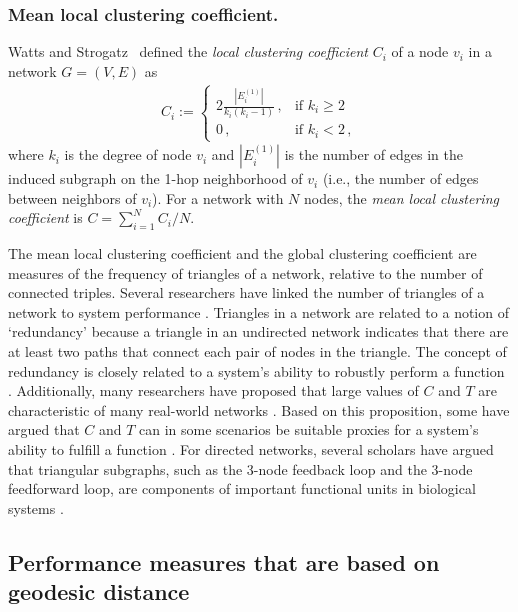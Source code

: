 \documentclass{comnet-mod}
\begin{document}
\subsubsection{Mean local clustering coefficient.}

Watts and Strogatz~\cite{Watts1998} defined the \textit{local clustering coefficient} $C_i$ of a node $v_i$ in a network $G=(V,E)$ as 
\begin{align}
	C_i := \left\{\begin{matrix}2\frac{|E^{(1)}_{i}|}{k_i(k_i-1)}\,, & \textrm{if } k_i \geq 2 \\
		0\,, & \textrm{if } k_i < 2\,,\end{matrix}\right.\label{eq:lcc}
\end{align}
where $k_i$ is the degree of node $v_i$ and $|E^{(1)}_{i}|$ is the number of edges in the induced subgraph on the 1-hop neighborhood of $v_i$ (i.e., the number of edges between neighbors of $v_i$). 
For a network with $N$ nodes, the \textit{mean local clustering coefficient} is $C = \sum_{i=1}^NC_i/N$.

The mean local clustering coefficient and the global clustering coefficient are measures of the frequency of triangles of a network, relative to the number of connected triples.
Several researchers have linked the number of triangles of a network to system performance \cite{Ogras2006, Liu2013}. Triangles in a network are related to a notion of `redundancy' \cite[p.\,186]{Newman2018} because a triangle in an undirected network indicates that there are at least two paths that connect each pair of nodes in the triangle. The concept of redundancy is closely related to a system's ability to robustly perform a function \cite{Schreiber2002, Zhou2004, Wagner2005, Meepetchdee2007, Masel2009, Whitacre2010, Randles2011, Yazdani2011}. Additionally, many researchers have proposed that large values of $C$ and $T$ are characteristic of many real-world networks \cite{Watts1998, Newman2003, Fagiolo2007, Radicchi2017}. Based on this proposition, some have argued that $C$ and $T$ can in some scenarios be suitable proxies for a system's ability to fulfill a function \cite{Alon2007, Liu2013}. For directed networks, several scholars have argued that triangular subgraphs, such as the 3-node feedback loop and the 3-node feedforward loop, are components of important functional units in biological systems \cite{Kitano2004, Alon2007, Kwon2008}. 


\subsection{Performance measures that are based on geodesic distance}\label{sec:review:paths}
\end{document}
